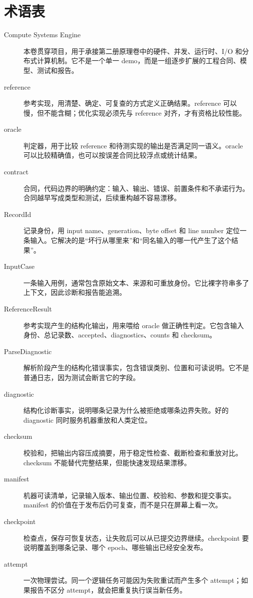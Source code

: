 \chapter*{术语表}

\begin{description}
  \item[Compute Systems Engine] 本卷贯穿项目，用于承接第二册原理卷中的硬件、并发、运行时、I/O 和分布式计算机制。它不是一个单一 demo，而是一组逐步扩展的工程合同、模型、测试和报告。
  \item[reference] 参考实现，用清楚、确定、可复查的方式定义正确结果。reference 可以慢，但不能含糊；优化实现必须先与 reference 对齐，才有资格比较性能。
  \item[oracle] 判定器，用于比较 reference 和待测实现的输出是否满足同一语义。oracle 可以比较精确值，也可以按误差合同比较浮点或统计结果。
  \item[contract] 合同，代码边界的明确约定：输入、输出、错误、前置条件和不承诺行为。合同越早写成类型和测试，后续重构越不容易漂移。
  \item[RecordId] 记录身份，用 input name、generation、byte offset 和 line number 定位一条输入。它解决的是“坏行从哪里来”和“同名输入的哪一代产生了这个结果”。
  \item[InputCase] 一条输入用例，通常包含原始文本、来源和可重放身份。它比裸字符串多了上下文，因此诊断和报告能追溯。
  \item[ReferenceResult] 参考实现产生的结构化输出，用来喂给 oracle 做正确性判定。它包含输入身份、总记录数、accepted、diagnostics、counts 和 checksum。
  \item[ParseDiagnostic] 解析阶段产生的结构化错误事实，包含错误类别、位置和可读说明。它不是普通日志，因为测试会断言它的字段。
  \item[diagnostic] 结构化诊断事实，说明哪条记录为什么被拒绝或哪条边界失败。好的 diagnostic 同时服务机器重放和人类定位。
  \item[checksum] 校验和，把输出内容压成摘要，用于稳定性检查、截断检查和重放对比。checksum 不能替代完整结果，但能快速发现结果漂移。
  \item[manifest] 机器可读清单，记录输入版本、输出位置、校验和、参数和提交事实。manifest 的价值在于发布后仍可复查，而不是只在屏幕上看一次。
  \item[checkpoint] 检查点，保存可恢复状态，让失败后可以从已提交边界继续。checkpoint 要说明覆盖到哪条记录、哪个 epoch、哪些输出已经安全发布。
  \item[attempt] 一次物理尝试。同一个逻辑任务可能因为失败重试而产生多个 attempt；如果报告不区分 attempt，就会把重复执行误当新任务。

\end{description}

